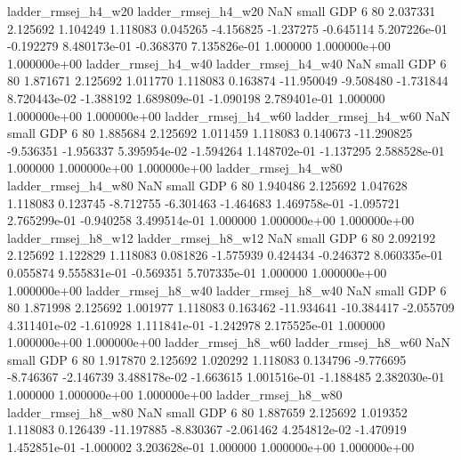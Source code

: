      ladder_rmsej_h4_w20      ladder_rmsej_h4_w20                   NaN      small      GDP                 6 80 2.037331       2.125692 1.104249       1.118083    0.045265     -4.156825     -1.237275    -0.645114   5.207226e-01 -0.192279 8.480173e-01    -0.368370   7.135826e-01            1.000000    1.000000e+00        1.000000e+00
     ladder_rmsej_h4_w40      ladder_rmsej_h4_w40                   NaN      small      GDP                 6 80 1.871671       2.125692 1.011770       1.118083    0.163874    -11.950049     -9.508480    -1.731844   8.720443e-02 -1.388192 1.689809e-01    -1.090198   2.789401e-01            1.000000    1.000000e+00        1.000000e+00
     ladder_rmsej_h4_w60      ladder_rmsej_h4_w60                   NaN      small      GDP                 6 80 1.885684       2.125692 1.011459       1.118083    0.140673    -11.290825     -9.536351    -1.956337   5.395954e-02 -1.594264 1.148702e-01    -1.137295   2.588528e-01            1.000000    1.000000e+00        1.000000e+00
     ladder_rmsej_h4_w80      ladder_rmsej_h4_w80                   NaN      small      GDP                 6 80 1.940486       2.125692 1.047628       1.118083    0.123745     -8.712755     -6.301463    -1.464683   1.469758e-01 -1.095721 2.765299e-01    -0.940258   3.499514e-01            1.000000    1.000000e+00        1.000000e+00
     ladder_rmsej_h8_w12      ladder_rmsej_h8_w12                   NaN      small      GDP                 6 80 2.092192       2.125692 1.122829       1.118083    0.081826     -1.575939      0.424434    -0.246372   8.060335e-01  0.055874 9.555831e-01    -0.569351   5.707335e-01            1.000000    1.000000e+00        1.000000e+00
     ladder_rmsej_h8_w40      ladder_rmsej_h8_w40                   NaN      small      GDP                 6 80 1.871998       2.125692 1.001977       1.118083    0.163462    -11.934641    -10.384417    -2.055709   4.311401e-02 -1.610928 1.111841e-01    -1.242978   2.175525e-01            1.000000    1.000000e+00        1.000000e+00
     ladder_rmsej_h8_w60      ladder_rmsej_h8_w60                   NaN      small      GDP                 6 80 1.917870       2.125692 1.020292       1.118083    0.134796     -9.776695     -8.746367    -2.146739   3.488178e-02 -1.663615 1.001516e-01    -1.188485   2.382030e-01            1.000000    1.000000e+00        1.000000e+00
     ladder_rmsej_h8_w80      ladder_rmsej_h8_w80                   NaN      small      GDP                 6 80 1.887659       2.125692 1.019352       1.118083    0.126439    -11.197885     -8.830367    -2.061462   4.254812e-02 -1.470919 1.452851e-01    -1.000002   3.203628e-01            1.000000    1.000000e+00        1.000000e+00
